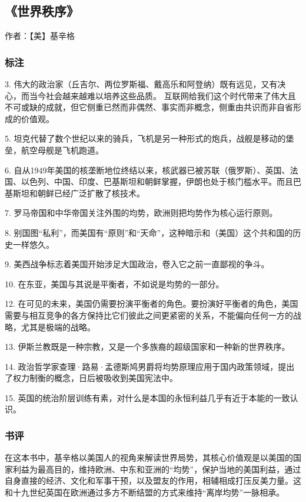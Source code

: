 \subsection{《世界秩序》}

作者：【美】基辛格

\subsubsection{标注}

3. 伟大的政治家（丘吉尔、两位罗斯福、戴高乐和阿登纳）既有远见，又有决心，而当今社会越来越难以培养这些品质。 互联网给我们这个时代带来了伟大且不可或缺的成就，但它侧重已然而非偶然、事实而非概念，侧重由共识而非自省形成的价值观。

5. 坦克代替了数个世纪以来的骑兵，飞机是另一种形式的炮兵，战舰是移动的堡垒，航空母舰是飞机跑道。

6. 自从1949年美国的核垄断地位终结以来，核武器已被苏联（俄罗斯）、英国、法国、以色列、中国、印度、巴基斯坦和朝鲜掌握，伊朗也处于核门槛水平。而且巴基斯坦和朝鲜已经广泛扩散了核技术。

7. 罗马帝国和中华帝国关注外围的均势，欧洲则把均势作为核心运行原则。

8. 别国图“私利”，而美国有“原则”和“天命”，这种暗示和（美国）这个共和国的历史一样悠久。

9. 美西战争标志着美国开始涉足大国政治，卷入它之前一直鄙视的争斗。

10. 在东亚，美国与其说是平衡者，不如说是均势的一部分。

12. 在可见的未来，美国仍需要扮演平衡者的角色。要扮演好平衡者的角色，美国需要与相互竞争的各方保持比它们彼此之间更紧密的关系，不能偏向任何一方的战略，尤其是极端的战略。

13. 伊斯兰教既是一种宗教，又是一个多族裔的超级国家和一种新的世界秩序。

14. 政治哲学家查理·路易·孟德斯鸠男爵将均势原理应用于国内政策领域，提出了权力制衡的概念，日后被吸收到美国宪法中。

15. 英国的统治阶层训练有素，对什么是本国的永恒利益几乎有近于本能的一致认识。

\subsubsection{书评}

在这本书中，基辛格以美国人的视角来解读世界局势，其核心价值观是以美国的国家利益为最高目的，维持欧洲、中东和亚洲的“均势”，保护当地的美国利益，通过自身直接的经济、文化和军事干预，以及盟友的作用，相辅相成打压反美力量。这和十九世纪英国在欧洲通过多方不断结盟的方式来维持“离岸均势”一脉相承。

